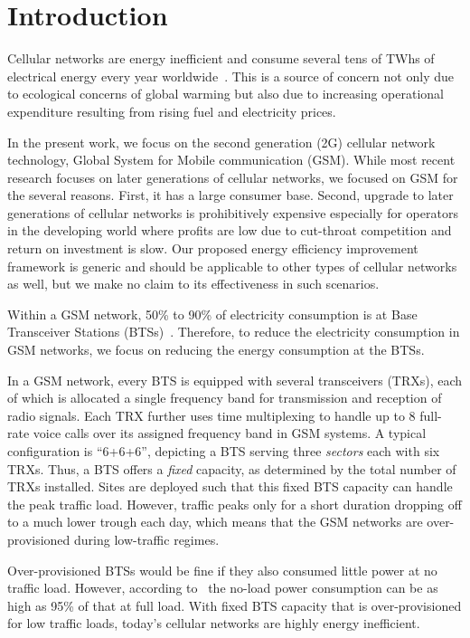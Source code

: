 \section{Introduction}
\label{sec:intro} 
Cellular networks are energy inefficient and consume several tens of TWhs of electrical energy
every year worldwide~\cite{Oh:Comm:2011}. This is a source of concern not only due to ecological concerns of global warming but also due to increasing operational expenditure resulting from rising fuel and electricity prices. 

In the present work, we focus on the second generation (2G) cellular network technology, Global System for Mobile communication (GSM). While most recent research focuses on later generations of cellular networks, we focused on GSM for the several reasons. First, it has a large consumer base. Second, upgrade to later generations of cellular networks is prohibitively expensive especially for operators in the developing world where profits are low due to cut-throat competition and return on investment is slow. Our proposed energy efficiency improvement framework is generic and should be applicable to other types of cellular networks as well, but we make no claim to its effectiveness in such scenarios. 

Within a GSM network, 50\% to 90\% of electricity consumption is at Base Transceiver Stations (BTSs)~\cite{Louhi:2007:BTSPower:INTELEC,Oh:Comm:2011}. Therefore, to reduce the electricity consumption in GSM networks, we focus on reducing the energy consumption at the BTSs.

In a GSM network, every BTS is equipped with several transceivers (TRXs), each of
which is allocated a single frequency band for transmission and
reception of radio signals. Each TRX further uses time
multiplexing to handle up to 8 full-rate voice calls over its
assigned frequency band in GSM systems. A typical configuration
is ``6+6+6'', depicting a BTS serving three \textit{sectors}
each with six TRXs. Thus, a BTS offers a \textit{fixed} capacity, as
determined by the total number of TRXs installed. Sites are
deployed such that this fixed BTS capacity can handle the peak
traffic load. However, traffic peaks only for a short duration
dropping off to a much lower trough each day, which means that
the GSM networks are over-provisioned during
low-traffic regimes.

Over-provisioned BTSs would be fine if they also
consumed little power at no traffic
load. However, according to~\cite{Peng:2011:BTSSaving:Mobicom}
the no-load power consumption can be as high as 95\% of that at
full load. With fixed BTS capacity that is over-provisioned for
low traffic loads, today's cellular networks are highly energy inefficient.

